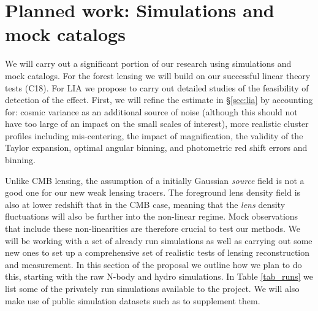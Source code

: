 \section{Planned work: Simulations and mock catalogs}\label{sec:sim}

We will carry out a significant portion of our research using
 simulations and mock catalogs.
For the forest lensing we will build on our successful
linear theory tests (C18). For LIA
we propose to carry out detailed studies of the feasibility of
detection of the effect. First, we will refine the estimate 
in \S\ref{sec:lia} by accounting for: cosmic variance as an
additional source of noise (although this should not have too large
of an impact on the small scales of interest), more realistic cluster
profiles including mis-centering, the impact of magnification, the
validity of the Taylor expansion, optimal angular binning, and
photometric red shift errors and binning.



Unlike CMB lensing, the assumption of a initially Gaussian {\it source}
field is not a good one for our new weak lensing tracers. 
The foreground lens density field is also
at lower redshift that in the CMB case, meaning that the {\it lens}
density fluctuations will also be further into the non-linear regime. Mock
observations that include these non-linearities are therefore crucial
to test our methods. We will be working with a set of already run simulations
as well as carrying out some new ones to set up a comprehensive set
of realistic tests of lensing reconstruction and measurement. In this
section of the proposal we outline  how we plan to do this, starting
with the raw N-body and hydro simulations. In Table \ref{tab_runs} we list
some of the privately run simulations available to the project. We will
also make use of public simulation datasets such as \cite{giocoli2016}
 to supplement them.




